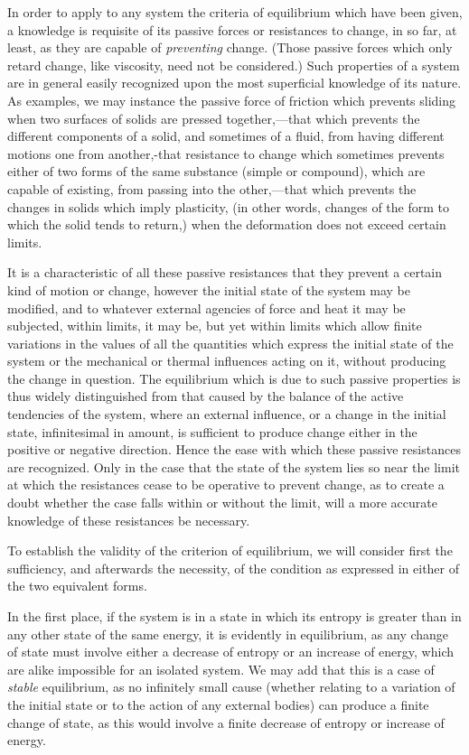 \documentclass[12pt]{article}
\begin{document}
%
In order to apply to any system the criteria of equilibrium which have been given, a knowledge is requisite of its passive forces or resistances to change, in so far, at least, as they are capable of \textit{preventing} change. (Those passive forces which only retard change, like viscosity, need not be considered.) Such properties of a system are in general easily recognized upon the most superficial knowledge of its nature. As examples, we may instance the passive force of friction which prevents sliding when two surfaces of solids are pressed together,---that which prevents the different components of a solid, and sometimes of a fluid, from having different motions one from another,-that resistance to change which sometimes prevents either of two forms of the same substance (simple or compound), which are capable of existing, from passing into the other,---that which prevents the changes in solids which imply plasticity, (in other words, changes of the form to which the solid tends to return,) when the deformation does not exceed certain limits.

It is a characteristic of all these passive resistances that they prevent a certain kind of motion or change, however the initial state of the system may be modified, and to whatever external agencies of force and heat it may be subjected, within limits, it may be, but yet within limits which allow finite variations in the values of all the quantities which express the initial state of the system or the mechanical or thermal influences acting on it, without producing the change in question. The equilibrium which is due to such passive properties is thus widely distinguished from that caused by the balance of the active tendencies of the system, where an external influence, or a change in the initial state, infinitesimal in amount, is sufficient to produce change either in the positive or negative direction. Hence the ease with which these passive resistances are recognized. Only in the case that the state of the system lies so near the limit at which the resistances cease to be operative to prevent change, as to create a doubt whether the case falls within or without the limit, will a more accurate knowledge of these resistances be necessary.

To establish the validity of the criterion of equilibrium, we will consider first the sufficiency, and afterwards the necessity, of the condition as expressed in either of the two equivalent forms.

In the first place, if the system is in a state in which its entropy is greater than in any other state of the same energy, it is evidently in equilibrium, as any change of state must involve either a decrease of entropy or an increase of energy, which are alike impossible for an isolated system. We may add that this is a case of \textit{stable} equilibrium, as no infinitely small cause (whether relating to a variation of the initial state or to the action of any external bodies) can produce a finite change of state, as this would involve a finite decrease of entropy or increase of energy.
\end{document}
